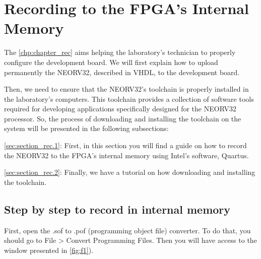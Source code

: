 %
%
%
%



\chapter{Recording to the FPGA's Internal Memory} \label{chp:chapter_rec}

    The \autoref{chp:chapter_rec} aims helping the laboratory's technician to properly configure the development board. We will first explain how to upload permanently the NEORV32, described in VHDL, to the development board.

    Then, we need to ensure that the NEORV32's toolchain is properly installed in the laboratory's computers. This toolchain provides a collection of software tools required for developing applications specifically designed for the NEORV32 processor. So, the process of downloading and installing the toolchain on the system will be presented in the following subsections:

    \autoref{sec:section_rec.1}:
    First, in this section you will find a guide on how to record the NEORV32 to the FPGA's internal memory using Intel's software, Quartus.
        
    \autoref{sec:section_rec.2}:
    Finally, we have a tutorial on how downloading and installing the toolchain.
    
    \section{Step by step to record in internal memory} \label{sec:section_rec.1}
    
        First, open the .sof to .pof (programming object file) converter. To do that, you should go to File > Convert Programming Files. Then you will have access to the window presented in \autoref{fig:f1}).

